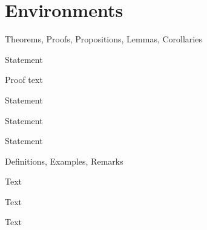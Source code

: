 
\section{Environments}

\begin{frame}{Theorems, Proofs, Propositions, Lemmas, Corollaries}
\begin{The}\label{The}	 Statement	       \end{The}
\begin{Proof}            Proof text		   \end{Proof}

\vspace{.2cm}\begin{Pro}		         Statement 		   \end{Pro}

\vspace{.2cm}\begin{Le}			     Statement         \end{Le}

\vspace{.2cm}\begin{Co}	             Statement	       \end{Co}
\end{frame}

\begin{frame}[squeeze]{Definitions, Examples, Remarks}
\begin{De}	 Text	\end{De}

\vspace{.2cm}\begin{Exa}			Text		\end{Exa}

\vspace{.2cm}\begin{Rmk}	Text		\end{Rmk}
\end{frame}


